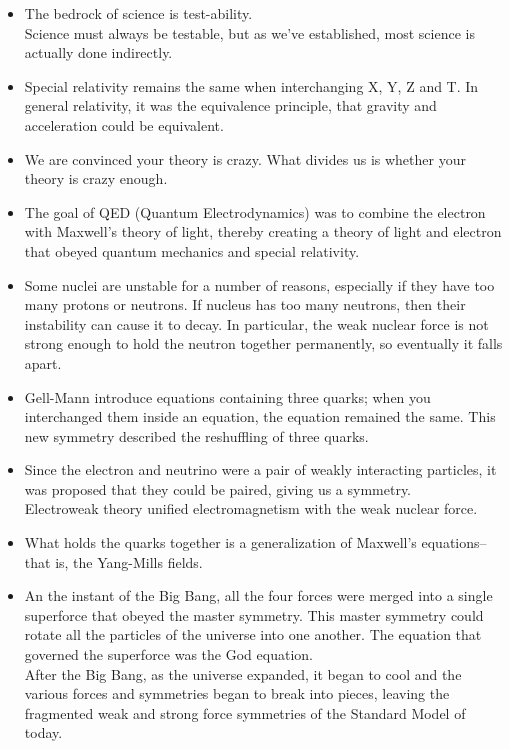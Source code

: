 \documentclass[UTF8]{ctexart}
\begin{document}
\begin{itemize}
			\item The bedrock of science is test-ability.\\
				Science must always be testable, but as we've established, most science is actually done indirectly.
			\item Special relativity remains the same when interchanging X, Y, Z and T. In general relativity, it was the equivalence principle, that gravity and acceleration could be equivalent.
			\item We are convinced your theory is crazy. What divides us is whether your theory is crazy enough.
			\item The goal of QED (Quantum Electrodynamics) was to combine the electron with Maxwell's theory of light, thereby creating a theory of light and electron that obeyed quantum mechanics and special relativity.
			\item Some nuclei are unstable for a number of reasons, especially if they have too many protons or neutrons. If nucleus has too many neutrons, then their instability can cause it to decay. In particular, the weak nuclear force is not strong enough to hold the neutron together permanently, so eventually it falls apart.
			\item Gell-Mann introduce equations containing three quarks; when you interchanged them inside an equation, the equation remained the same. This new symmetry described the reshuffling of three quarks.
			\item Since the electron and neutrino were a pair of weakly interacting particles, it was proposed that they could be paired, giving us a symmetry.\\
				Electroweak theory unified electromagnetism with the weak nuclear force.
			\item What holds the quarks together is a generalization of Maxwell's equations--that is, the Yang-Mills fields.
			\item An the instant of the Big Bang, all the four forces were merged into a single superforce that obeyed the master symmetry. This master symmetry could rotate all the particles of the universe into one another. The equation that governed the superforce was the God equation.\\
				After the Big Bang, as the universe expanded, it began to cool and the various forces and symmetries began to break into pieces, leaving the fragmented weak and strong force symmetries of the Standard Model of today.


\end{itemize}
\end{document}
